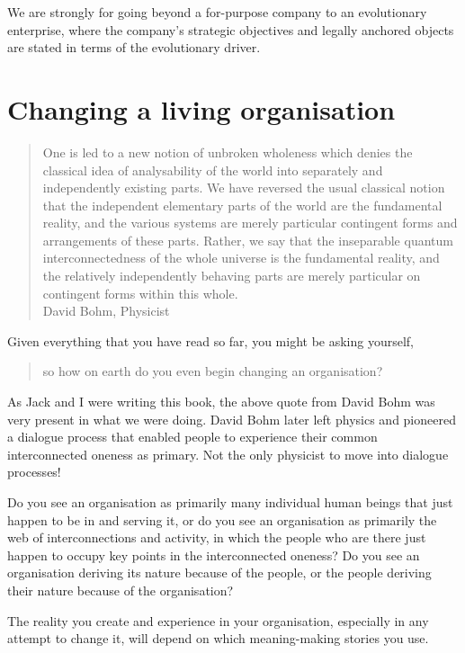 We are strongly for going beyond a for-purpose company to an evolutionary enterprise, where the company’s strategic objectives and legally anchored objects are stated in terms of the evolutionary driver. 




\section{Changing a living organisation}
\label{section:change-living-organisation}
\begin{quote}
One is led to a new notion of unbroken wholeness which denies the classical idea of analysability of the world into separately and independently existing parts. We have reversed the usual classical notion that the independent elementary parts of the world are the fundamental reality, and the various systems are merely particular contingent forms and arrangements of these parts. Rather, we say that the inseparable quantum interconnectedness of the whole universe is the fundamental reality, and the relatively independently behaving parts are merely particular on contingent forms within this whole.\\
\raggedleft\textemdash David Bohm, Physicist
\end{quote}  


Given everything that you have read so far, you might be asking yourself, 


\begin{quote} 
so how on earth do you even begin changing an organisation?
\end{quote}


As Jack and I were writing this book, the above quote from David Bohm was very present in what we were doing. David Bohm later left physics and pioneered a dialogue process that enabled people to experience their common interconnected oneness as primary. Not the only physicist to move into dialogue processes! 


Do you see an organisation as primarily many individual human beings that just happen to be in and serving it, or do you see an organisation as primarily the web of interconnections and activity, in which the people who are there just happen to occupy key points in the interconnected oneness? Do you see an organisation deriving its nature because of the people, or the people deriving their nature because of the organisation? 


The reality you create and experience in your organisation, especially in any attempt to change it, will depend on which meaning\hyp{}making stories you use. 


